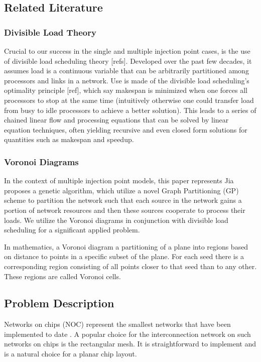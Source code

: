 \subsection{Related Literature}

\subsubsection{Divisible Load Theory}
Crucial to our success in the single and multiple injection point cases, is the use of divisible load scheduling theory [refs].  Developed over the past few decades, it assumes load is a continuous variable that can be arbitrarily partitioned among processors and links in a network.  Use is made of the divisible load scheduling’s optimality principle [ref], which say makespan is minimized when one forces all processors to stop at the same time (intuitively otherwise one could transfer load from busy to idle processors to achieve a better solution).  This leads to a series of chained linear flow and processing equations that can be solved by linear equation techniques, often yielding recursive and even closed form solutions for quantities such as makespan and speedup. 

\subsubsection{Voronoi Diagrams}
In the context of multiple injection point models, this paper represents 
Jia  \cite{jia2010scheduling} proposes a genetic algorithm, which utilize a novel Graph Partitioning (GP) scheme to partition the network such that each source in the network gains a portion of network resources and then these sources cooperate to process their loads.  We utilize the Voronoi diagrams \cite{jia2010scheduling} in conjunction with divisible load scheduling for a significant applied problem. 

In mathematics, a Voronoi diagram \cite{fortune1995voronoi} a partitioning of a plane into regions based on distance to points in a specific subset of the plane. For each seed there is a corresponding region consisting of all points closer to that seed than to any other. These regions are called Voronoi cells. 

\subsection{Problem Description}
Networks on chips (NOC) represent the smallest networks that have been implemented to date \cite{robertazzi2017computer}.  A popular choice for the interconnection network on such networks on chips is the rectangular mesh.  It is straightforward to implement and is a natural choice for a planar chip layout.

